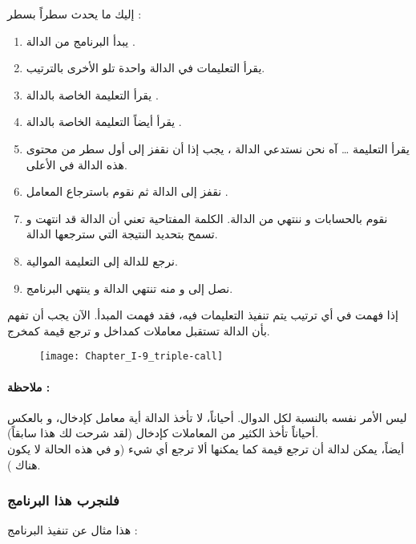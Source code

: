 إليك ما يحدث سطراً بسطر :

\begin{enumerate}
	\item يبدأ البرنامج من الدالة
	.
	\item يقرأ التعليمات في الدالة واحدة تلو الأخرى بالترتيب.
	\item يقرأ التعليمة الخاصة بالدالة
	.
	\item يقرأ أيضاً التعليمة الخاصة بالدالة 
	.
	\item يقرأ التعليمة
	\dots
	آه نحن نستدعي الدالة 
	،
	يجب إذا أن نقفز إلى أول سطر من محتوى هذه الدالة في الأعلى.
	\item نقفز إلى الدالة
	 ثم نقوم باسترجاع المعامل
	.
	\item نقوم بالحسابات و ننتهي من الدالة. الكلمة المفتاحية 
	تعني أن الدالة قد انتهت و تسمح بتحديد النتيجة التي سترجعها الدالة.
	\item نرجع للدالة 
	إلى التعليمة الموالية.
	\item نصل إلى 
	و منه تنتهي الدالة
	و ينتهي البرنامج.
\end{enumerate}

إذا فهمت في أي ترتيب يتم تنفيذ التعليمات فيه، فقد فهمت المبدأ. الآن يجب أن تفهم بأن الدالة تستقبل معاملات كمداخل و ترجع قيمة كمخرج.

\begin{figure}[H]
	\centering
	\texttt{[image: Chapter\_I-9\_triple-call]}
\end{figure}

\paragraph{ملاحظة :}

ليس الأمر نفسه بالنسبة لكل الدوال. أحياناً، لا تأخذ الدالة أية معامل كإدخال، و بالعكس أحياناً تأخذ الكثير من المعاملات كإدخال (لقد شرحت لك هذا سابقاً).\\
أيضاً، يمكن لدالة أن ترجع قيمة كما يمكنها ألا ترجع أي شيء (و في هذه الحالة لا يكون هناك
).

\subsubsection{فلنجرب هذا البرنامج}

هذا مثال عن تنفيذ البرنامج :

